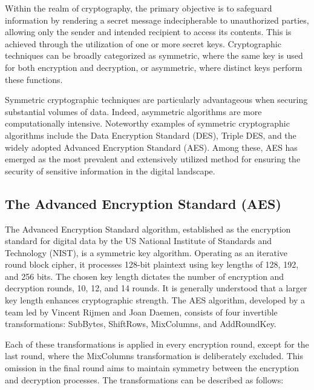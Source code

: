 \documentclass[runningheads]{llncs}
\begin{document}
Within the realm of cryptography, the primary objective is to safeguard information by rendering a secret message indecipherable to unauthorized parties, allowing only the sender and intended recipient to access its contents. This is achieved through the utilization of one or more secret keys. Cryptographic techniques can be broadly categorized as symmetric, where the same key is used for both encryption and decryption, or asymmetric, where distinct keys perform these functions.

Symmetric cryptographic techniques are particularly advantageous when securing substantial volumes of data. Indeed, asymmetric algorithms are more computationally intensive. Noteworthy examples of symmetric cryptographic algorithms include the Data Encryption Standard (DES), Triple DES, and the widely adopted Advanced Encryption Standard (AES). Among these, AES has emerged as the most prevalent and extensively utilized method for ensuring the security of sensitive information in the digital landscape.

\subsection{The Advanced Encryption Standard (AES)}

The Advanced Encryption Standard algorithm, established as the encryption standard for digital data by the US National Institute of Standards and Technology (NIST), is a symmetric key algorithm. Operating as an iterative round block cipher, it processes 128-bit plaintext using key lengths of 128, 192, and 256 bits. The chosen key length dictates the number of encryption and decryption rounds, 10, 12, and 14 rounds. It is generally understood that a larger key length enhances cryptographic strength. The AES algorithm, developed by a team led by Vincent Rijmen and Joan Daemen, consists of four invertible transformations: SubBytes, ShiftRows, MixColumns, and AddRoundKey.

Each of these transformations is applied in every encryption round, except for the last round, where the MixColumns transformation is deliberately excluded. This omission in the final round aims to maintain symmetry between the encryption and decryption processes. The transformations can be described as follows:
\end{document}
